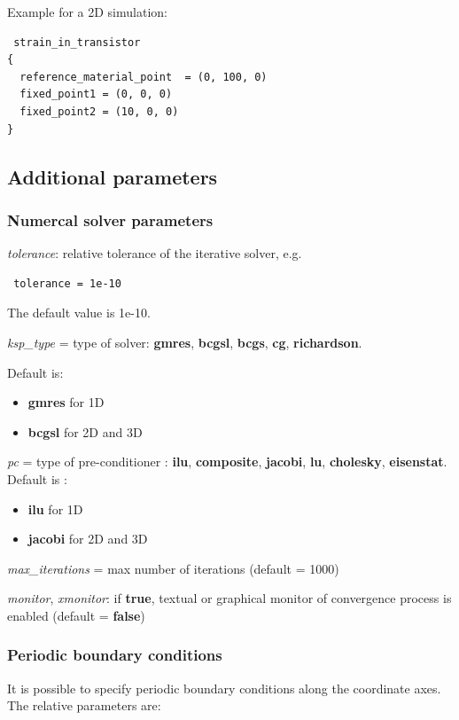 Example for a 2D simulation:
\begin{verbatim}
 strain_in_transistor
{
  reference_material_point  = (0, 100, 0)
  fixed_point1 = (0, 0, 0)
  fixed_point2 = (10, 0, 0)	 
}
\end{verbatim}
\subsection{Additional parameters}

\subsubsection{Numercal solver parameters}

\textit{tolerance}: relative tolerance of the iterative solver, e.g.
\begin{verbatim}
 tolerance = 1e-10
\end{verbatim}
The default  value is 1e-10.

\textit{ksp\_type} =  type of  solver: \textbf{gmres},  \textbf{bcgsl},  \textbf{bcgs}, \textbf{cg}, \textbf{richardson}.

Default is: 

\begin{itemize}
\item 
\textbf{gmres}  for  1D 
\item 
\textbf{bcgsl} for 2D and  3D  
\end{itemize}


\textit{pc} =  type of  pre-conditioner :  \textbf{ilu},  \textbf{composite},  \textbf{jacobi}, \textbf{lu}, \textbf{cholesky}, \textbf{eisenstat}.
\\
Default is : 

\begin{itemize}
\item 
\textbf{ilu}  for  1D 
\item 
\textbf{jacobi}  for 2D and  3D    
\end{itemize}


\textit{max\_iterations}  =  max  number of iterations (default = 1000)

\textit{monitor}, \textit{xmonitor}:  if  \textbf{true},  textual or graphical monitor of convergence process is  enabled (default = \textbf{false})





\subsubsection{Periodic boundary conditions}
It is possible to specify periodic boundary conditions along the coordinate axes. The relative parameters are:

